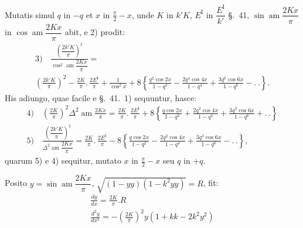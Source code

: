 \documentclass{article}
\begin{document}
Mutatis simul $q$ in $-q$ et $x$ in $\frac{\pi}{2}-x$, unde $K$ in $k'K$, $E^{\mathrm{I}}$ in $\dfrac{E^{\mathrm{I}}}{k'}$ §.\ 41, $\sin\operatorname{am}\dfrac{2Kx}{\pi}$ in $\cos\operatorname{am}\dfrac{2Kx}{\pi}$ abit, e 2) prodit:
\[
\begin{gathered}
\text{3)}\quad\frac{\left(\dfrac{2k'K}{\pi}\right)^{2}}{\cos^{2}\operatorname{am}\dfrac{2Kx}{\pi}}=\\[1.5ex]
\left(\frac{2k'K}{\pi}\right)^{2}-\frac{2K}{\pi}.\,\frac{2E^{\mathrm{I}}}{\pi}+\frac{1}{\cos^{2}x}+8\left\{\frac{q^{2}\cos 2x}{1-q^{2}}-\frac{2q^{4}\cos 4x}{1-q^{4}}+\frac{3q^{6}\cos 6x}{1-q^{6}}-.\,.\right\}.
\end{gathered}
\]
His adiungo, quae facile e §.\ 41.\ 1) sequuntur, hasce:
\[
\begin{gathered}
\text{4)}\quad\left(\frac{2K}{\pi}\right)^{2}\Delta^{2}\operatorname{am}\frac{2Kx}{\pi}=\frac{2K}{\pi}.\,\frac{2E^{\mathrm{I}}}{\pi}+8\left\{\frac{q\cos 2x}{1-q^{2}}+\frac{2q^{2}\cos 4x}{1-q^{4}}+\frac{3q^{3}\cos 6x}{1-q^{6}}+.\,.\right\}\\[1.5ex]
\text{5)}\quad\frac{\left(\dfrac{2k'K}{\pi}\right)^{2}}{\Delta^{2}\operatorname{am}\dfrac{2Kx}{\pi}}=\frac{2K}{\pi}.\,\frac{2E^{\mathrm{I}}}{\pi}-8\left\{\frac{q\cos 2x}{1-q^{2}}-\frac{2q^{2}\cos 4x}{1-q^{4}}+\frac{3q^{3}\cos 6x}{1-q^{6}}-.\,.\right\},
\end{gathered}
\]
quarum 5) e 4) sequitur, mutato $x$ in $\frac{\pi}{2}-x$ seu $q$ in $+q$.

Posito $y=\sin\operatorname{am}\dfrac{2Kx}{\pi}$, $\sqrt{(1-yy)(1-k^{2}yy)}=R$, fit:
\[
\begin{gathered}
\frac{dy}{dx}=\frac{2K}{\pi}.R\\[1.5ex]
\frac{d^{2}y}{dx^{2}}=-\left(\frac{2K}{\pi}\right)^{2}y(1+kk-2k^{2}y^{2})
\end{gathered}
\]
\end{document}
